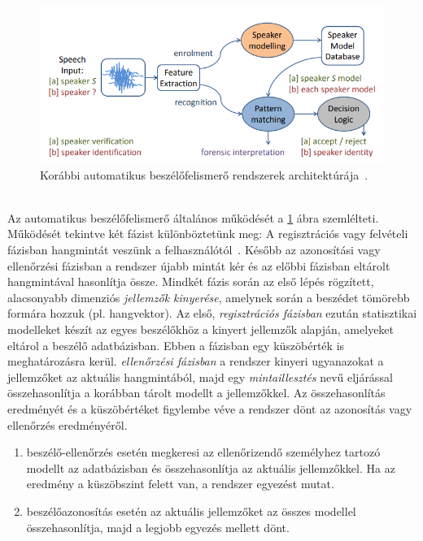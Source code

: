 \begin{figure}[!ht]
	\centering
	\includegraphics[width=150mm, keepaspectratio]{figures/automatic_speaker_recognition.png}
	\caption{Korábbi automatikus beszélőfelismerő rendszerek architektúrája~\cite{finnian_2014}.}
	\label{fig:automatic_speaker_recognition}
\end{figure}
\ \\
Az automatikus beszélőfelismerő általános működését a \ref{fig:automatic_speaker_recognition} ábra szemlélteti. Működését tekintve két fázist különböztetünk meg: A regisztrációs vagy felvételi fázisban hangmintát veszünk a felhasználótól~\cite{finnian_2014}. Később az azonosítási vagy ellenőrzési fázisban a rendszer újabb mintát kér és az előbbi fázisban eltárolt hangmintával hasonlítja össze. 
\newline
\newline
Mindkét fázis során az első lépés rögzített, alacsonyabb dimenziós \emph{jellemzők kinyerése}, amelynek során a beszédet tömörebb formára hozzuk (pl. hangvektor). Az első, \emph{regisztrációs fázisban} ezután statisztikai modelleket készít az egyes beszélőkhöz a kinyert jellemzők alapján, amelyeket eltárol a beszélő adatbázisban. Ebben a fázisban egy küszöbérték is meghatározásra kerül. \emph{ellenőrzési fázisban} a rendszer kinyeri ugyanazokat a jellemzőket az aktuális hangmintából, majd egy \emph{mintaillesztés} nevű eljárással összehasonlítja a korábban tárolt modellt a jellemzőkkel. Az összehasonlítás eredményét és a küszöbértéket figylembe véve a rendszer dönt az azonosítás vagy ellenőrzés eredményéről.

\begin{enumerate}
	\item beszélő-ellenőrzés esetén megkeresi az ellenőrizendő személyhez tartozó modellt az adatbázisban és összehasonlítja az aktuális jellemzőkkel. Ha az eredmény a küszöbszint felett van, a rendszer egyezést mutat.
	\item beszélőazonosítás esetén az aktuális jellemzőket az összes modellel összehasonlítja, majd a legjobb egyezés mellett dönt. 
\end{enumerate}

